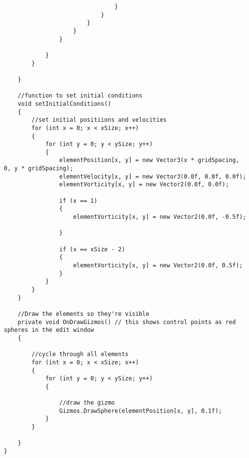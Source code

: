 \begin{mdframed}[linecolor=black, topline=true, bottomline=true,
  leftline=false, rightline=false]
\begin{verbatim}
                                }
                            }
                        }
                    }
                }

            }
        }

    }

    //function to set initial conditions
    void setInitialConditions()
    {
        //set initial positiions and velocities
        for (int x = 0; x < xSize; x++)
        {
            for (int y = 0; y < ySize; y++)
            {
                elementPosition[x, y] = new Vector3(x * gridSpacing, 0, y * gridSpacing);
                elementVelocity[x, y] = new Vector3(0.0f, 0.0f, 0.0f);
                elementVorticity[x, y] = new Vector2(0.0f, 0.0f);

                if (x == 1)
                {
                    elementVorticity[x, y] = new Vector2(0.0f, -0.5f);

                }

                if (x == xSize - 2)
                {
                    elementVorticity[x, y] = new Vector2(0.0f, 0.5f);
                }
            }
        }
    }

    //Draw the elements so they're visible
    private void OnDrawGizmos() // this shows control points as red spheres in the edit window
    {

        //cycle through all elements
        for (int x = 0; x < xSize; x++)
        {
            for (int y = 0; y < ySize; y++)
            {

                //draw the gizmo
                Gizmos.DrawSphere(elementPosition[x, y], 0.1f);
            }
        }

    }
}
\end{verbatim}
\end{mdframed}